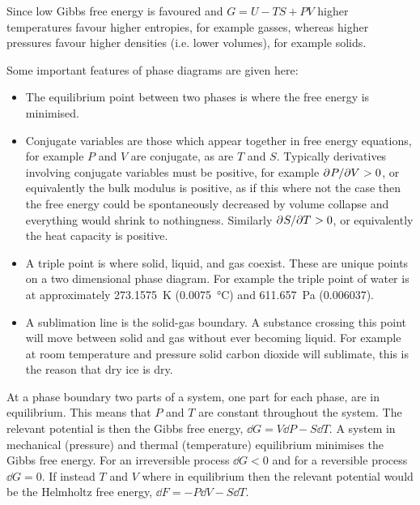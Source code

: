     Since low Gibbs free energy is favoured and \(G = U - TS + PV\) higher temperatures favour higher entropies, for example gasses, whereas higher pressures favour higher densities (i.e. lower volumes), for example solids.
    
    Some important features of phase diagrams are given here:
    \begin{itemize}
        \item The equilibrium point between two phases is where the free energy is minimised.
        
        \item Conjugate variables are those which appear together in free energy equations, for example \(P\) and \(V\) are conjugate, as are \(T\) and \(S\).
        Typically derivatives involving conjugate variables must be positive, for example \(\partial^{}{P}/\partial{V}^{} > 0\), or equivalently the bulk modulus is positive, as if this where not the case then the free energy could be spontaneously decreased by volume collapse and everything would shrink to nothingness.
        Similarly \(\partial^{}{S}/\partial{T}^{} > 0\), or equivalently the heat capacity is positive.
        
        \item A triple point is where solid, liquid, and gas coexist.
        These are unique points on a two dimensional phase diagram.
        For example the triple point of water is at approximately \SI{273.1575}{\kelvin} (\SI{0.0075}{\degreeCelsius}) and \SI{611.657}{\pascal} (\SI{0.006037}{\atm}).
        
        \item A sublimation line is the solid-gas boundary.
        A substance crossing this point will move between solid and gas without ever becoming liquid.
        For example at room temperature and pressure solid carbon dioxide will sublimate, this is the reason that dry ice is dry.
    \end{itemize}

    At a phase boundary two parts of a system, one part for each phase, are in equilibrium.
    This means that \(P\) and \(T\) are constant throughout the system.
    The relevant potential is then the Gibbs free energy, \(\dd{G} = V\dd{P} - S\dd{T}\).
    A system in mechanical (pressure) and thermal (temperature) equilibrium minimises the Gibbs free energy.
    For an irreversible process \(\dd{G} < 0\) and for a reversible process \(\dd{G} = 0\).
    If instead \(T\) and \(V\) where in equilibrium then the relevant potential would be the Helmholtz free energy, \(\dd{F} = -P\dd{V} - S\dd{T}\).
    
